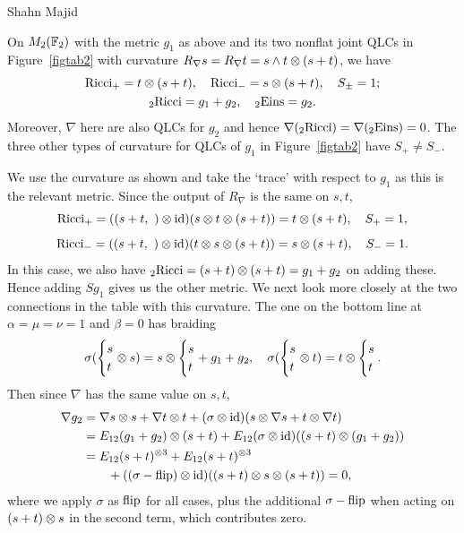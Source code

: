 \begin{artengenv}{Shahn Majid}
\begin{proposition} On $M_2({\mathbb{F}}_2)$ with the metric $g_1$ as above and its two nonflat joint QLCs in Figure~\ref{figtab2} with curvature $R_\nabla s=R_\nabla t=s\wedge t\otimes (s+t)$, we have
\[\begin{gathered}
{\rm Ricci}_+=t\otimes (s+t),\quad {\rm Ricci}_-=s\otimes (s+t),\quad S_\pm=1;\\ {}_2{\rm Ricci}=g_1+g_2,\quad {}_2{\rm Eins}=g_2.
\end{gathered}  \]
Moreover, $\nabla$ here are also QLCs for $g_2$ and hence $\nabla( {}_2{\rm Ricci})=\nabla ({}_2{\rm Eins})=0$. 
The three other types of curvature for QLCs of $g_1$ in Figure~\ref{figtab2} have $S_+\ne S_-$. 
\end{proposition}
\proof We use the curvature as shown and take the `trace' with respect to $g_1$ as this is the relevant metric. Since the output of $R_\nabla$ is the same on $s,t$, 
\[ {\rm Ricci}_+=((s+t ,\ )\otimes{\rm id})( s\otimes t\otimes (s+t))=t\otimes (s+t),\quad S_+=1,\]
\[ {\rm Ricci}_-=((s+t ,\ )\otimes{\rm id})( t\otimes s\otimes (s+t))=s\otimes (s+t),\quad S_-=1.\]
In this case, we also have ${}_2{\rm Ricci}=(s+t)\otimes (s+t)=g_1+g_2$ on adding these. Hence adding $Sg_1$ gives us the other metric. We next look more closely at the two connections in the table with this curvature. The one on the bottom line at $\alpha=\mu=\nu=1$ and $\beta=0$ has braiding
\[\sigma( \begin{cases}s\\ t\end{cases}\nquad\tens s)=s\tens \begin{cases}s\\ t\end{cases}\nquad+ g_1+g_2,\quad \sigma(\begin{cases}s\\ t\end{cases}\nquad\tens t)=t\tens \begin{cases}s\\ t\end{cases}\nquad.\]
Then since $\nabla$ has the same value on $s,t$, 
\begin{align*}\nabla g_2&=\nabla s\otimes s+\nabla t\otimes t+(\sigma\otimes{\rm id})(s\otimes \nabla s+ t\otimes \nabla t)\\
&=E_{12}(g_1+g_2)\otimes (s+t)+ E_{12}(\sigma\otimes{\rm id})((s+t)\otimes(g_1+g_2))\\
&=E_{12}(s+t)^{\otimes 3}+ E_{12}(s+t)^{\otimes 3}\\
&\qquad+ ((\sigma-{\rm flip})\otimes {\rm id})((s+t)\otimes s\otimes (s+ t))=0,\end{align*}
where we apply $\sigma$ as ${\rm flip}$ for all cases, plus the additional $\sigma-{\rm flip}$ when acting on $(s+t)\otimes s$ in the
second term, which contributes zero. 


\end{artengenv}
